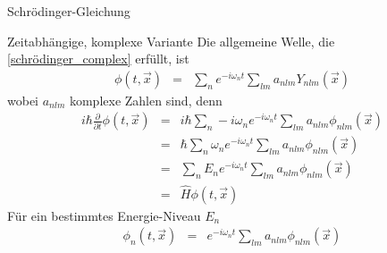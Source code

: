 \begin{chapter}{\titlestr}
\begin{section}{Schrödinger-Gleichung}
\begin{subsection}{Zeitabhängige, komplexe Variante}
Die allgemeine Welle, die \ref{schrödinger_complex} erfüllt, ist
\begin{eqnarray*}
\phi(t,\vec{x}) &=& \sum_{n}e^{-i\omega_n t}\sum_{lm} a_{nlm}Y_{nlm}(\vec{x})
\end{eqnarray*}
wobei $a_{nlm}$ komplexe Zahlen sind, denn
\begin{eqnarray*}
i\hbar\frac{\partial}{\partial t}\phi(t,\vec{x}) &=& i\hbar\sum_{n}-i\omega_ne^{-i\omega_n t}\sum_{lm} a_{nlm}\phi_{nlm}(\vec{x})\\
&=& \hbar\sum_{n}\omega_ne^{-i\omega_n t}\sum_{lm} a_{nlm}\phi_{nlm}(\vec{x})\\
&=& \sum_{n}E_ne^{-i\omega_n t}\sum_{lm} a_{nlm}\phi_{nlm}(\vec{x})\\
&=& \hat{H}\phi(t,\vec{x})
\end{eqnarray*}
Für ein bestimmtes Energie-Niveau $E_n$
\begin{eqnarray*}
\phi_n(t,\vec{x}) &=& e^{-i\omega_n t}\sum_{lm} a_{nlm}\phi_{nlm}(\vec{x})
\end{eqnarray*}
\end{subsection}


\end{section}
\end{chapter}
